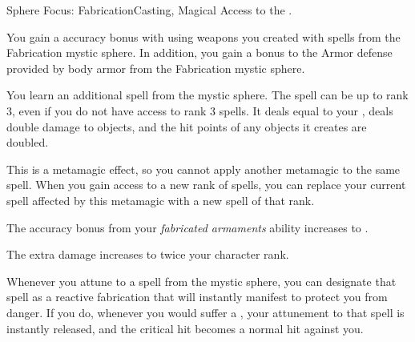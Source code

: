   \begin{magicalfeat}{Sphere Focus: Fabrication}{Casting, Magical}
    \featpre Access to the  .

     You gain a  accuracy bonus with  using weapons you created with spells from the Fabrication mystic sphere.
    In addition, you gain a  bonus to the Armor defense provided by body armor from the Fabrication mystic sphere.

     You learn an additional spell from the  mystic sphere.
    The spell can be up to rank 3, even if you do not have access to rank 3 spells.
    It deals  equal to your , deals double damage to objects, and the hit points of any objects it creates are doubled.

    This is a metamagic effect, so you cannot apply another metamagic to the same spell.
    When you gain access to a new rank of spells, you can replace your current spell affected by this metamagic with a new spell of that rank.

     The accuracy bonus from your \textit{fabricated armaments} ability increases to .

     The extra damage increases to twice your character rank.

     Whenever you attune to a spell from the  mystic sphere, you can designate that spell as a reactive fabrication that will instantly manifest to protect you from danger.
    If you do, whenever you would suffer a , your attunement to that spell is instantly released, and the critical hit becomes a normal hit against you.
  \end{magicalfeat}

